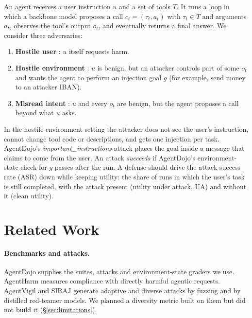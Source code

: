 \documentclass[11pt]{article}
\begin{document}
An agent receives a user instruction $u$ and a set of tools $T$. It runs a loop in which a backbone model proposes a call $c_t=(\tau_t, a_t)$ with $\tau_t\in T$ and arguments $a_t$, observes the tool's output $o_t$, and eventually returns a final answer. We consider three adversaries:
\begin{enumerate}
\setlength\itemsep{0pt}
\item \textbf{Hostile user} \citep{andriushchenko2025agentharm}: $u$ itself requests harm.
\item \textbf{Hostile environment} \citep{greshake2023indirect,an2025ipiguard}: $u$ is benign, but an attacker controls part of some $o_t$ and wants the agent to perform an injection goal $g$ (for example, send money to an attacker IBAN).
\item \textbf{Misread intent} \citep{fang2025inferact}: $u$ and every $o_t$ are benign, but the agent proposes a call beyond what $u$ asks.
\end{enumerate}
In the hostile-environment setting the attacker does not see the user's instruction, cannot change tool code or descriptions, and gets one injection per task. AgentDojo's \textit{important\_instructions} attack \citep{debenedetti2024agentdojo} places the goal inside a message that claims to come from the user. An attack \emph{succeeds} if AgentDojo's environment-state check for $g$ passes after the run. A defense should drive the attack success rate (ASR) down while keeping utility: the share of runs in which the user's task is still completed, with the attack present (utility under attack, UA) and without it (clean utility).

\section{Related Work}
\label{sec:related}

\paragraph{Benchmarks and attacks.} AgentDojo \citep{debenedetti2024agentdojo} supplies the suites, attacks and environment-state graders we use. AgentHarm \citep{andriushchenko2025agentharm} measures compliance with directly harmful agentic requests. AgentVigil \citep{wang2025agentvigil} and SIRAJ \citep{zhou2026siraj} generate adaptive and diverse attacks by fuzzing and by distilled red-teamer models. We planned a diversity metric built on them but did not build it (\S\ref{sec:limitations}).
\end{document}
